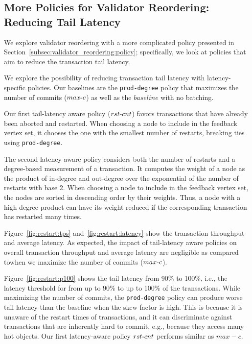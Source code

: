 
\subsection{More Policies for Validator Reordering: Reducing Tail Latency}

We explore validator reordering with a more complicated policy presented in Section~\ref{subsec:validator_reordering:policy}; specifically, we look at policies that aim to reduce the transaction tail latency.

We explore the possibility of reducing transaction tail latency with latency-specific policies. Our baselines are the \texttt{prod-degree} policy that maximizes the number of commits ($max\hbox{-}c$) as well as the $baseline$ with no batching. 

Our first tail-latency aware policy ($rst\hbox{-}cnt$) favors transactions that have already been aborted and restarted. When choosing a node to include in the feedback vertex set, it chooses the one with the smallest number of restarts, breaking ties using \texttt{prod-degree}.

The second latency-aware policy considers both the number of restarts and a degree-based measurement of a transaction. It computes the weight of a node as the product of in-degree and out-degree over the exponential of the number of restarts with base 2. When choosing a node to include in the feedback vertex set, the nodes are sorted in descending order by their weights. Thus, a node with a high degree product can have its weight reduced if the corresponding transaction has restarted many times.

Figure~\ref{fig:restart:tps} and~\ref{fig:restart:latency} show the transaction throughput and average latency. As expected, the impact of tail-latency aware policies on overall transaction throughput and average latency are negligible as compared towhen we maximize the number of commits ($max\hbox{-}c$).

Figure~\ref{fig:restart:p100} shows the tail latency from 90\% to 100\%, i.e., the latency threshold for from up to 90\% to up to 100\% of the transactions. While maximizing the number of commits, the \texttt{prod-degree} policy can produce worse tail latency than the baseline when the skew factor is high. This is because it is unaware of the restart times of transactions, and it can discriminate against transactions that are inherently hard to commit, e.g., because they access many hot objects. Our first latency-aware policy $rst\hbox{-}cnt$ performs similar as $max-c$.
 
